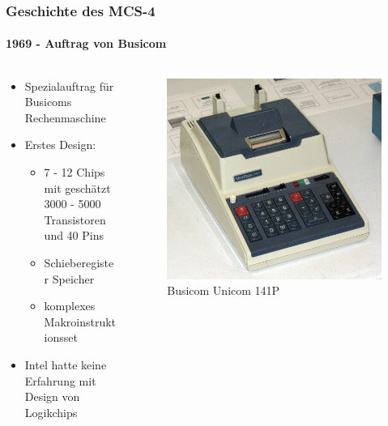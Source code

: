 \begin{frame}
	\frametitle{Geschichte des MCS-4}
	\framesubtitle{1969 - Auftrag von Busicom}
	\begin{columns}[c]
		\begin{column}{.5\textwidth}
			\begin{itemize}
				\item Spezialauftrag für Busicoms Rechenmaschine
				\item Erstes Design:
				\begin{itemize}
					\item 7 - 12 Chips mit geschätzt 3000 - 5000 Transistoren und 40 Pins
					\item Schieberegister Speicher
					\item komplexes Makroinstruktionsset
				\end{itemize}
				\item Intel hatte keine Erfahrung mit Design von Logikchips
			\end{itemize}
		\end{column}
		\begin{column}{.5\textwidth}
			\begin{figure}[ht]
				 \includegraphics[width=0.8\linewidth]{images/unicom_141P.jpg}
				\caption{Busicom Unicom 141P }
			\end{figure}
		\end{column}
	\end{columns}
\end{frame}


